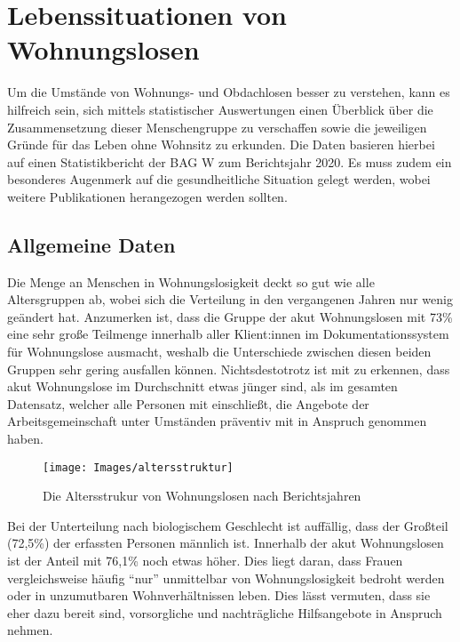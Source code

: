\section{Lebenssituationen von Wohnungslosen}

Um die Umstände von Wohnungs- und Obdachlosen besser zu verstehen, kann es hilfreich sein, sich mittels statistischer Auswertungen einen Überblick über die Zusammensetzung dieser Menschengruppe zu verschaffen sowie die jeweiligen Gründe für das Leben ohne Wohnsitz zu erkunden. Die Daten basieren hierbei auf einen Statistikbericht der \ac{BAG W} zum Berichtsjahr 2020. Es muss zudem ein besonderes Augenmerk auf die gesundheitliche Situation gelegt werden, wobei weitere Publikationen herangezogen werden sollten.

\subsection{Allgemeine Daten}

Die Menge an Menschen in Wohnungslosigkeit deckt so gut wie alle Altersgruppen ab, wobei sich die Verteilung in den vergangenen Jahren nur wenig geändert hat. Anzumerken ist, dass die Gruppe der akut Wohnungslosen mit 73\% eine sehr große Teilmenge innerhalb aller Klient:innen im Dokumentationssystem für Wohnungslose ausmacht, weshalb die Unterschiede zwischen diesen beiden Gruppen sehr gering ausfallen können. Nichtsdestotrotz ist mit zu erkennen, dass akut Wohnungslose im Durchschnitt etwas jünger sind, als im gesamten Datensatz, welcher alle Personen mit einschließt, die Angebote der Arbeitsgemeinschaft unter Umständen präventiv mit in Anspruch genommen haben.

\begin{figure}[h]
	\centering
	\texttt{[image: Images/altersstruktur]}
	\caption[Altersstruktur von Wohnungslosen]{Die Altersstrukur von Wohnungslosen nach Berichtsjahren \citep{BAGW.2022}}
	\label{fig:altersstruktur}
\end{figure}

Bei der Unterteilung nach biologischem Geschlecht ist auffällig, dass der Großteil (72,5\%) der erfassten Personen männlich ist. Innerhalb der akut Wohnungslosen ist der Anteil mit 76,1\% noch etwas höher. Dies liegt daran, dass Frauen vergleichsweise häufig \enquote{nur} unmittelbar von Wohnungslosigkeit bedroht werden oder in unzumutbaren Wohnverhältnissen leben. Dies lässt vermuten, dass sie eher dazu bereit sind, vorsorgliche und nachträgliche Hilfsangebote in Anspruch nehmen.

